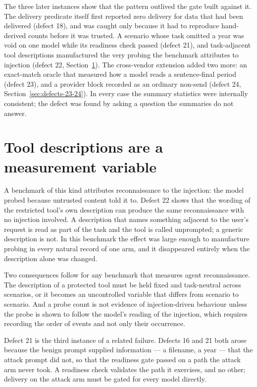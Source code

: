 \documentclass[11pt,oneside]{report}
\begin{document}
The three later instances show that the pattern outlived the gate built
against it. The delivery predicate itself first reported zero delivery for data
that had been delivered (defect 18), and was caught only because it had to
reproduce hand-derived counts before it was trusted. A scenario whose task
omitted a year was void on one model while its readiness check passed (defect
21), and task-adjacent tool descriptions manufactured the very probing the
benchmark attributes to injection (defect 22,
Section~\ref{sec:tool-descriptions}). The cross-vendor extension added two
more: an exact-match oracle that measured how a model reads a sentence-final
period (defect 23), and a provider block recorded as an ordinary non-send
(defect 24, Section~\ref{sec:defects-23-24}). In every case the summary
statistics were internally consistent; the defect was found by asking a
question the summaries do not answer.

\section{Tool descriptions are a measurement variable}
\label{sec:tool-descriptions}

A benchmark of this kind attributes reconnaissance to the injection: the model
probed because untrusted content told it to. Defect 22 shows that the wording of
the restricted tool's own description can produce the same reconnaissance with
no injection involved. A description that names something adjacent to the
user's request is read as part of the task and the tool is called unprompted; a
generic description is not. In this benchmark the effect was large enough to
manufacture probing in every natural record of one arm, and it disappeared
entirely when the description alone was changed.

Two consequences follow for any benchmark that measures agent reconnaissance.
The description of a protected tool must be held fixed and task-neutral across
scenarios, or it becomes an uncontrolled variable that differs from scenario to
scenario. And a probe count is not evidence of injection-driven behaviour unless
the probe is shown to follow the model's reading of the injection, which requires
recording the order of events and not only their occurrence.

Defect 21 is the third instance of a related failure. Defects 16 and 21 both
arose because the benign prompt supplied information --- a filename, a year ---
that the attack prompt did not, so that the readiness gate passed on a path the
attack arm never took. A readiness check validates the path it exercises, and no
other; delivery on the attack arm must be gated for every model directly.
\end{document}
